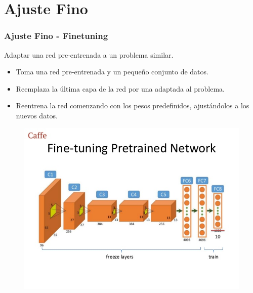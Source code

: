 \documentclass[10pt,center]{beamer}
\begin{document}
\section{Ajuste Fino}
\begin{frame}
  \frametitle{Ajuste Fino - Finetuning}
  Adaptar una red pre-entrenada a un problema similar.
    \begin{itemize}
     \item Toma una red pre-entrenada y un pequeño conjunto de datos.
     \item Reemplaza la última capa de la red por una adaptada al problema.
     \item Reentrena la red comenzando con los pesos predefinidos, ajustándolos a los nuevos datos.
    \end{itemize}
  \begin{figure}[h]
  \captionsetup[subfigure]{labelformat=empty}
    \begin{center}
      \includegraphics[height=0.6\textheight]{./img/fine_tuning.jpg}
    \end{center}
  \end{figure}
\end{frame}
\end{document}
